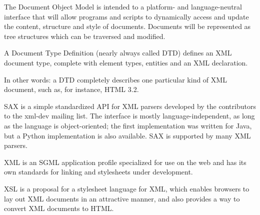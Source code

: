 \documentclass{howto}
\begin{document}
\begin{definitions}
%
The Document Object Model is intended to a platform- and
language-neutral interface that will allow programs and scripts to
dynamically access and update the content, structure and style of
documents. Documents will be represented as tree structures which can
be traversed and modified.

%
A Document Type Definition (nearly always called DTD) defines
an XML document type, complete with element types, entities
and an XML declaration.
       
In other words: a DTD completely describes one particular kind
of XML document, such as, for instance, HTML 3.2.
        
%
SAX is a simple standardized API for XML parsers developed by the
contributors to the xml-dev mailing list. The interface is mostly
language-independent, as long as the language is object-oriented; the
first implementation was written for Java, but a Python implementation
is also available.  SAX is supported by many XML parsers.
          
%
XML is an SGML application profile specialized for use on the
web and has its own standards for linking and stylesheets under development.
          

%
XSL is a proposal for a stylesheet language for XML, which
enables browsers to lay out XML documents in an attractive
manner, and also provides a way to convert XML documents to
HTML.
\end{definitions}
          
%
\end{document}
